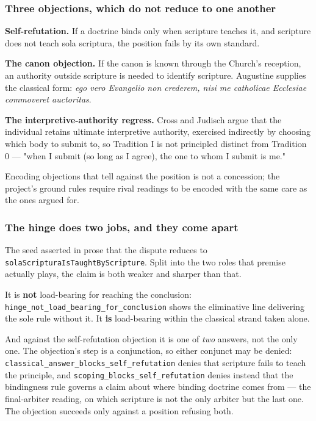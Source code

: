 \documentclass[11pt]{article}
\begin{document}
\subsubsection*{Three objections, which do not reduce to one another}
\textbf{Self-refutation.} If a doctrine binds only when scripture teaches it, and scripture does not teach sola scriptura, the position fails by its own standard.

\textbf{The canon objection.} If the canon is known through the Church's reception, an authority outside scripture is needed to identify scripture. Augustine supplies the classical form: \emph{ego vero Evangelio non crederem, nisi me catholicae Ecclesiae commoveret auctoritas}.

\textbf{The interpretive-authority regress.} Cross and Judisch argue that the individual retains ultimate interpretive authority, exercised indirectly by choosing which body to submit to, so Tradition I is not principled distinct from Tradition 0 — "when I submit (so long as I agree), the one to whom I submit is me."

Encoding objections that tell against the position is not a concession; the project's ground rules require rival readings to be encoded with the same care as the ones argued for.

\subsubsection*{The hinge does two jobs, and they come apart}
The seed asserted in prose that the dispute reduces to \texttt{sola\allowbreak{}Scriptura\allowbreak{}Is\allowbreak{}Taught\allowbreak{}By\allowbreak{}Scripture}. Split into the two roles that premise actually plays, the claim is both weaker and sharper than that.

It is \textbf{not} load-bearing for reaching the conclusion: \texttt{hinge\_\allowbreak{}not\_\allowbreak{}load\_\allowbreak{}bearing\_\allowbreak{}for\_\allowbreak{}conclusion} shows the eliminative line delivering the sole rule without it. It \textbf{is} load-bearing within the classical strand taken alone.

And against the self-refutation objection it is one of \emph{two} answers, not the only one. The objection's step is a conjunction, so either conjunct may be denied: \texttt{classical\_\allowbreak{}answer\_\allowbreak{}blocks\_\allowbreak{}self\_\allowbreak{}refutation} denies that scripture fails to teach the principle, and \texttt{scoping\_\allowbreak{}blocks\_\allowbreak{}self\_\allowbreak{}refutation} denies instead that the bindingness rule governs a claim about where binding doctrine comes from — the final-arbiter reading, on which scripture is not the only arbiter but the last one. The objection succeeds only against a position refusing both.
\end{document}
